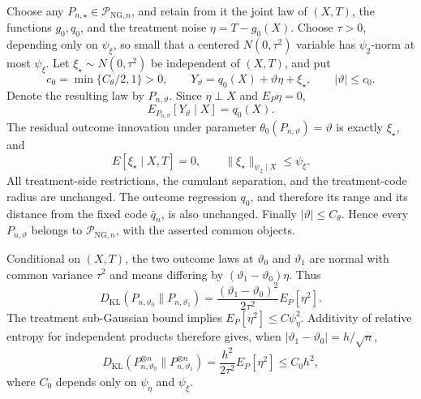 Choose any \(P_{n,\star}\in\mathcal P_{\mathrm{NG},n}\), and retain from it the joint law of \((X,T)\), the functions \(g_0,q_0\), and the treatment noise \(\eta=T-g_0(X)\).  Choose \(\tau>0\), depending only on \(\psi_{\xi}\), so small that a centered \(N(0,\tau^2)\) variable has \(\psi_2\)-norm at most \(\psi_{\xi}\).  Let \(\xi_{\star}\sim N(0,\tau^2)\) be independent of \((X,T)\), and put
\[
 c_0=\min\{C_{\theta}/2,1\}>0,
 \qquad
 Y_{\vartheta}=q_0(X)+\vartheta\eta+\xi_{\star},
 \qquad |\vartheta|\le c_0.
\]
Denote the resulting law by \(P_{n,\vartheta}\).  Since \(\eta\perp X\) and \(E_P\eta=0\),
\[
 E_{P_{n,\vartheta}}[Y_{\vartheta}\mid X]=q_0(X).
\]
The residual outcome innovation under parameter \(\theta_0(P_{n,\vartheta})=\vartheta\) is exactly \(\xi_{\star}\), and
\[
 E[\xi_{\star}\mid X,T]=0,
 \qquad
 \|\xi_{\star}\|_{\psi_2\mid X}\le\psi_{\xi}.
\]
All treatment-side restrictions, the cumulant separation, and the treatment-code radius are unchanged.  The outcome regression \(q_0\), and therefore its range and its distance from the fixed code \(\bar q_n\), is also unchanged.  Finally \(|\vartheta|\le C_{\theta}\).  Hence every \(P_{n,\vartheta}\) belongs to \(\mathcal P_{\mathrm{NG},n}\), with the asserted common objects.

Conditional on \((X,T)\), the two outcome laws at \(\vartheta_0\) and \(\vartheta_1\) are normal with common variance \(\tau^2\) and means differing by \((\vartheta_1-\vartheta_0)\eta\).  Thus
\[
 D_{\mathrm{KL}}(P_{n,\vartheta_0}\|P_{n,\vartheta_1})
 =\frac{(\vartheta_1-\vartheta_0)^2}{2\tau^2}E_P[\eta^2].
\]
The treatment sub-Gaussian bound implies \(E_P[\eta^2]\le C\psi_{\eta}^2\).  Additivity of relative entropy for independent products therefore gives, when \(|\vartheta_1-\vartheta_0|=h/\sqrt n\),
\[
 D_{\mathrm{KL}}(P_{n,\vartheta_0}^{\otimes n}\|P_{n,\vartheta_1}^{\otimes n})
 =\frac{h^2}{2\tau^2}E_P[\eta^2]
 \le C_0h^2,
\]
where \(C_0\) depends only on \(\psi_{\eta}\) and \(\psi_{\xi}\).